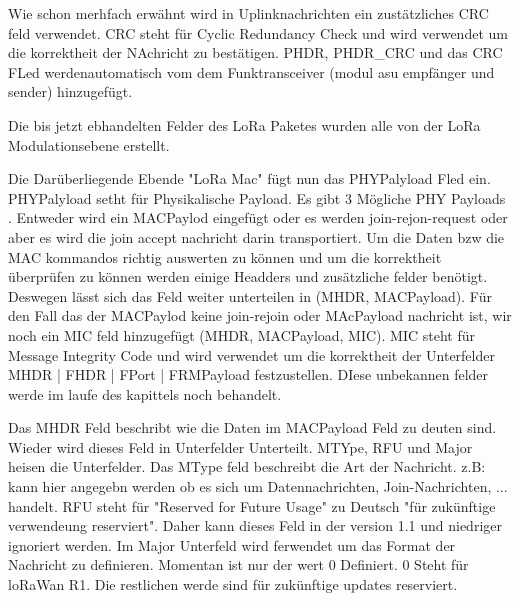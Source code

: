 \documentclass[a4paper,12pt]{article}
\begin{document}
            Wie schon merhfach erwähnt wird in Uplinknachrichten ein zustätzliches CRC feld verwendet. CRC steht für Cyclic Redundancy Check und wird verwendet um die korrektheit der NAchricht zu bestätigen. PHDR, PHDR\_CRC und das CRC FLed werdenautomatisch vom dem Funktransceiver (modul asu empfänger und sender) hinzugefügt.
            
            Die bis jetzt ebhandelten Felder des LoRa Paketes wurden alle von der LoRa Modulationsebene erstellt.

            Die Darüberliegende Ebende "LoRa Mac" fügt nun das PHYPalyload Fled ein. PHYPalyload setht für Physikalische Payload. Es gibt 3 Mögliche PHY Payloads . Entweder wird ein MACPaylod eingefügt oder es werden join-rejon-request oder aber es wird die join accept nachricht darin transportiert. 
            Um die Daten bzw die MAC kommandos richtig auswerten zu können und um die korrektheit überprüfen zu können werden einige Headders und zusätzliche felder benötigt. Deswegen lässt sich das Feld weiter unterteilen in (MHDR, MACPayload). Für den Fall das der MACPaylod keine join-rejoin oder MAcPayload nachricht ist,
            wir noch ein MIC feld hinzugefügt (MHDR, MACPayload, MIC). MIC steht für Message Integrity Code und wird verwendet um die korrektheit der Unterfelder MHDR | FHDR | FPort | FRMPayload festzustellen. DIese unbekannen felder werde im laufe des kapittels noch behandelt.

            Das MHDR Feld beschribt wie die Daten im MACPayload Feld zu deuten sind. Wieder wird dieses Feld in Unterfelder Unterteilt. MTYpe, RFU und Major heisen die Unterfelder. Das MType feld beschreibt die Art der Nachricht. z.B: kann hier angegebn werden ob es sich um Datennachrichten, Join-Nachrichten, ... handelt. 
            RFU steht für "Reserved for Future Usage" zu Deutsch "für zukünftige verwendeung reserviert". 
            Daher kann dieses Feld in der version 1.1 und niedriger ignoriert werden.
            Im Major Unterfeld wird ferwendet um das Format der Nachricht zu definieren. Momentan ist nur der wert 0 Definiert. 0 Steht für loRaWan R1. Die restlichen werde sind für zukünftige updates reserviert.
\end{document}
